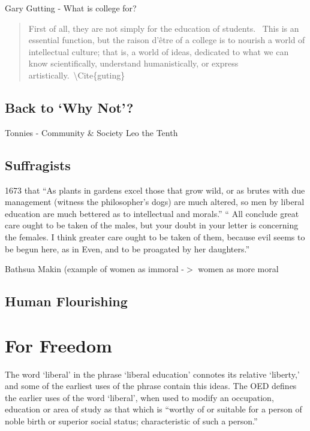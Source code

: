 Gary Gutting - What is college for?

\begin{quote}

First of all, they are not simply for the education of students.  This is an essential function, but the raison d'être of a college is to nourish a world of intellectual culture; that is, a world of ideas, dedicated to what we can know scientifically, understand humanistically, or express artistically. \textbackslash{}Cite\{guting\}
\end{quote}

\section{Back to `Why Not'?}
\label{backtowhynot}

Tonnies - Community \& Society
Leo the Tenth

\section{Suffragists}
\label{suffragists}

1673 that ``As plants in gardens excel those that grow wild, or as brutes with due management (witness the philosopher's dogs) are much altered, so men by liberal education are much bettered as to intellectual and morals.''
`` All conclude great care ought to be taken of the males, but your doubt in your letter is concerning the females. I think greater care ought to be taken of them, because evil seems to be begun here, as in Even, and to be proagated by her daughters.''

Bathsua Makin (example of women as immoral -$>$ women as more moral

\section{Human Flourishing}
\label{humanflourishing}

\chapter{For Freedom}
\label{forfreedom}

The word `liberal' in the phrase `liberal education' connotes its relative `liberty,' and some of the earliest uses of the phrase contain this ideas. The OED defines the earlier uses of the word `liberal', when used to modify an occupation, education or area of study as that which is ``worthy of or suitable for a person of noble birth or superior social status; characteristic of such a person.''

